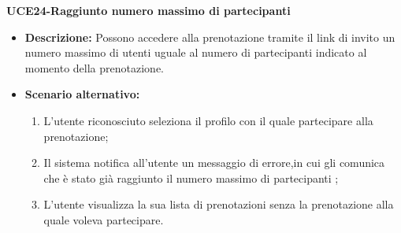 \textbf{UCE24-Raggiunto numero massimo di partecipanti}
\begin{itemize}
    \item \textbf{Descrizione: }Possono accedere alla prenotazione tramite il link di
    invito un numero massimo di utenti uguale al numero di partecipanti indicato al momento della
    prenotazione.
    \item \textbf{Scenario alternativo: }
    \begin{enumerate}
        \item L'utente riconosciuto seleziona il profilo con il quale partecipare alla prenotazione;
        \item Il sistema notifica all'utente un messaggio di errore,in cui gli comunica che è stato
        già raggiunto il numero massimo di partecipanti ;
        \item L'utente visualizza la sua lista di prenotazioni senza la prenotazione alla quale voleva
        partecipare.
    \end{enumerate}
\end{itemize}

